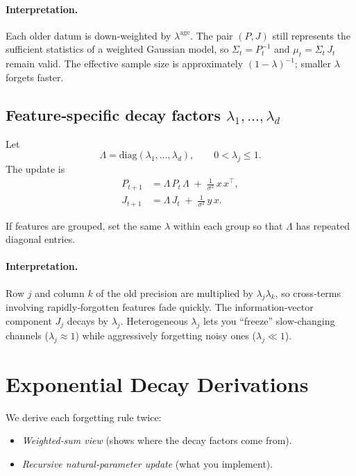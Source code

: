 \documentclass[11pt]{article}
\begin{document}
\paragraph{Interpretation.}
Each older datum is down‐weighted by \(\lambda^{\text{age}}\).  The pair \((P,J)\) still represents the sufficient statistics of a weighted Gaussian model, so 
\(\Sigma_t = P_t^{-1}\) and \(\mu_t = \Sigma_t\,J_t\) remain valid.  The effective sample size is approximately \((1-\lambda)^{-1}\); smaller \(\lambda\) forgets faster.

\subsection{Feature‐specific decay factors \(\lambda_1,\dots,\lambda_d\)}

Let
\[
\Lambda = \mathrm{diag}(\lambda_1,\dots,\lambda_d),\qquad 0<\lambda_j\le1.
\]
The update is
\begin{equation}\label{eq:feature-decay}
\begin{split}
P_{t+1} &= \Lambda\,P_t\,\Lambda \;+\;\frac{1}{\sigma^2}\,x\,x^\top,\\
J_{t+1} &= \Lambda\,J_t \;+\;\frac{1}{\sigma^2}\,y\,x.
\end{split}
\tag{5.2}
\end{equation}

If features are grouped, set the same \(\lambda\) within each group so that \(\Lambda\) has repeated diagonal entries.

\paragraph{Interpretation.}
Row \(j\) and column \(k\) of the old precision are multiplied by \(\lambda_j\lambda_k\), so cross‐terms involving rapidly‐forgotten features fade quickly.  The information‐vector component \(J_j\) decays by \(\lambda_j\).  Heterogeneous \(\lambda_j\) lets you “freeze” slow‐changing channels (\(\lambda_j\approx1\)) while aggressively forgetting noisy ones (\(\lambda_j\ll1\)).

\section{Exponential Decay Derivations}

We derive each forgetting rule twice:

\begin{itemize}
  \item \emph{Weighted‐sum view} (shows where the decay factors come from).
  \item \emph{Recursive natural‐parameter update} (what you implement).
\end{itemize}
\end{document}
